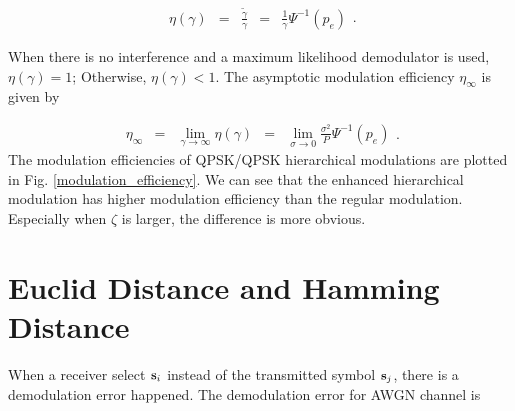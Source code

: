 \documentclass[10pt,fleqn, twocolumn]{IEEEtran}
\newcommand{\bs}{{\bf s}}
\begin{document}
\begin{equation}
\begin{array}{rcccl}
\eta\left(\gamma\right)&=&\frac{\tilde{\gamma}}{\gamma}&=&\frac{1}{\gamma}\Psi^{-1}\left(p_{e}\right)
\end{array}.\label{mod_eff}
\end{equation}

\noindent When there is no interference and a maximum likelihood
demodulator is used, $\eta\left(\gamma\right)=1$; Otherwise,
$\eta\left(\gamma\right)<1$.  The asymptotic modulation efficiency
$\eta_{\infty}$ is given by

\begin{equation}
\begin{array}{rcccl}
\eta_{\infty}&=&\lim\limits_{\gamma\rightarrow\infty}\eta\left(\gamma\right)&=&\lim\limits_{\sigma\rightarrow0}\frac{\sigma^2}{P}\Psi^{-1}\left(p_{e}\right)
\end{array}.\label{asy_mod_eff}
\end{equation}
\noindent The modulation efficiencies of QPSK/QPSK hierarchical
modulations are plotted in Fig. \ref{modulation_efficiency}. We
can see that the enhanced hierarchical modulation has higher
modulation efficiency than the regular modulation. Especially when
$\zeta$ is larger, the difference is more obvious.

\begin{figure}
\end{figure}

\section{Euclid Distance and Hamming Distance}
When a receiver select $\bs_i$ instead of the transmitted symbol
$\bs_j$, there is a demodulation error happened. The demodulation
error for AWGN channel is
\end{document}
